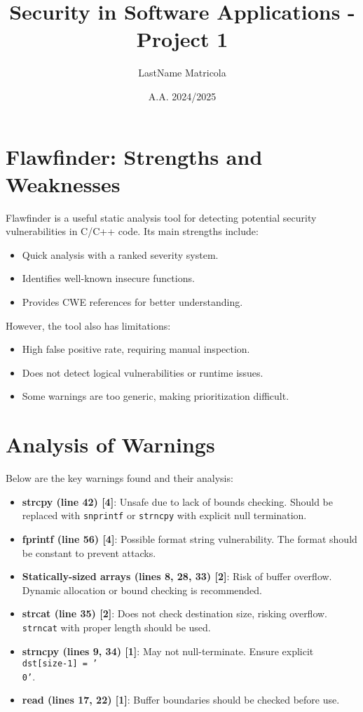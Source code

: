\documentclass[a4paper,10pt]{article}
\title{Security in Software Applications - Project 1}
\author{LastName Matricola}
\date{A.A. 2024/2025}
\begin{document}
\maketitle

\section{Flawfinder: Strengths and Weaknesses}
Flawfinder is a useful static analysis tool for detecting potential security vulnerabilities in C/C++ code. Its main strengths include:
\begin{itemize}
    \item Quick analysis with a ranked severity system.
    \item Identifies well-known insecure functions.
    \item Provides CWE references for better understanding.
\end{itemize}
However, the tool also has limitations:
\begin{itemize}
    \item High false positive rate, requiring manual inspection.
    \item Does not detect logical vulnerabilities or runtime issues.
    \item Some warnings are too generic, making prioritization difficult.
\end{itemize}

\section{Analysis of Warnings}
Below are the key warnings found and their analysis:
\begin{itemize}
    \item \textbf{strcpy (line 42) [4]}: Unsafe due to lack of bounds checking. Should be replaced with \texttt{snprintf} or \texttt{strncpy} with explicit null termination.
    \item \textbf{fprintf (line 56) [4]}: Possible format string vulnerability. The format should be constant to prevent attacks.
    \item \textbf{Statically-sized arrays (lines 8, 28, 33) [2]}: Risk of buffer overflow. Dynamic allocation or bound checking is recommended.
    \item \textbf{strcat (line 35) [2]}: Does not check destination size, risking overflow. \texttt{strncat} with proper length should be used.
    \item \textbf{strncpy (lines 9, 34) [1]}: May not null-terminate. Ensure explicit \texttt{dst[size-1] = '\\0'}.
    \item \textbf{read (lines 17, 22) [1]}: Buffer boundaries should be checked before use.
\end{itemize}
\end{document}

